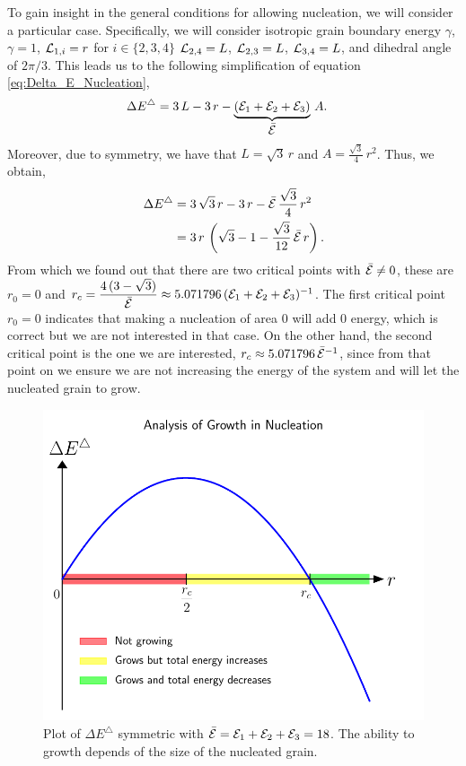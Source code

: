 To gain insight in the general conditions for allowing nucleation, we will consider a particular case.
Specifically, we will consider isotropic grain boundary energy $\gamma$, \ie $\gamma=1$,
$\mathcal{L}_{1,i}=r$ for $i\in\{2,3,4\}$
$\mathcal{L}_{2,4}=L$, $\mathcal{L}_{2,3}=L$, $\mathcal{L}_{3,4}=L$, and dihedral angle of $2\pi/3$. This leads us to the following simplification
of equation \eqref{eq:Delta_E_Nucleation},
\begin{align*}
    \Delta E^{\triangle} &=
    3\,L-3\,r-
    \underbrace{(\mathcal{E}_1+\mathcal{E}_2+\mathcal{E}_3)}_{\displaystyle{\bar{\mathcal{E}}}}\,A.
\end{align*}
Moreover, due to symmetry, we have that $L=\sqrt{3}\,r$ and $A=\frac{\sqrt{3}}{4}\,r^2$. 
Thus, we obtain,
\begin{align*}
    \Delta E^{\triangle} &=
    3\,\sqrt{3}\,r-3\,r-
    \bar{\mathcal{E}}\,\frac{\sqrt{3}}{4}\,r^2\\
    &=3\,r\,\left(\sqrt{3}-1-\frac{\sqrt{3}}{12}\,\bar{\mathcal{E}}\,r\right).
\end{align*}
From which we found out that there are two critical points
with $\bar{\mathcal{E}}\neq 0$, these are $r_0=0$ and 
$r_c=\dfrac{4\,(3 - \sqrt{3})}{\bar{\mathcal{E}}}\approx5.071796\,(\mathcal{E}_1+\mathcal{E}_2+\mathcal{E}_3)^{-1}$.
The first critical point $r_0=0$ indicates that making
a nucleation of area $0$ will add $0$ energy, which
is correct but we are not interested in that case.
On the other hand, the second critical point
is the one we are interested, 
$r_c \approx 5.071796 \,\bar{\mathcal{E}}^{-1}$,
since from that point on we ensure we are
not increasing the energy of the system and will
let the nucleated grain to grow.
%
\begin{figure}
    \centering
    \includegraphics[scale=0.5]{figures/stored_energy/DeltaETriangle.pdf}
    \caption[$\Delta E^{\triangle}$ induced by nucleation in a symmetric case.]{Plot of $\Delta E^{\triangle}$ symmetric with $\bar{\mathcal{E}}=\mathcal{E}_1+\mathcal{E}_2+\mathcal{E}_3=18$. The ability to growth depends of the size of the nucleated grain.}
    \label{fig:DeltaSE_E6}
\end{figure}
